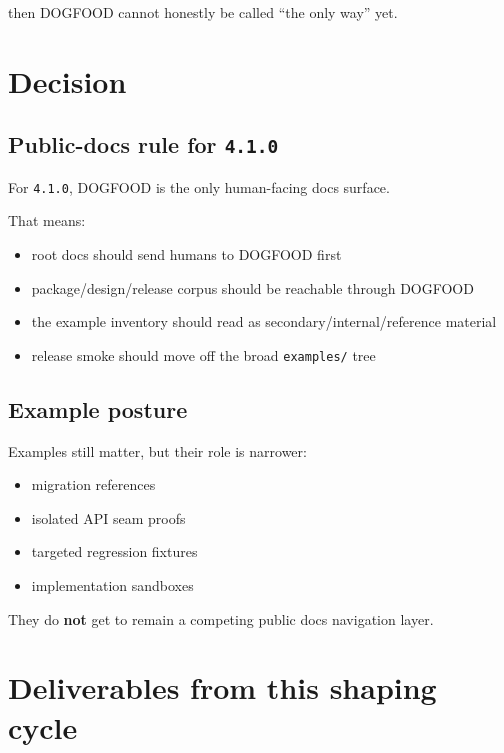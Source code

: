 then DOGFOOD cannot honestly be called ``the only way'' yet.

\section{Decision}\label{record-086-decision}

\subsection{\texorpdfstring{Public-docs rule for \texttt{4\allowbreak{}.\allowbreak{}1\allowbreak{}.\allowbreak{}0}}{Public-docs rule for }}\label{record-086-public-docs-rule-for-4.1.0}

For \texttt{4\allowbreak{}.\allowbreak{}1\allowbreak{}.\allowbreak{}0}, DOGFOOD is the only human-facing docs surface.

That means:

\begin{itemize}
\tightlist
\item
  root docs should send humans to DOGFOOD first
\item
  package/design/release corpus should be reachable through DOGFOOD
\item
  the example inventory should read as secondary/internal/reference material
\item
  release smoke should move off the broad \texttt{e\allowbreak{}x\allowbreak{}a\allowbreak{}m\allowbreak{}p\allowbreak{}l\allowbreak{}e\allowbreak{}s\allowbreak{}/} tree
\end{itemize}

\subsection{Example posture}\label{record-086-example-posture}

Examples still matter, but their role is narrower:

\begin{itemize}
\tightlist
\item
  migration references
\item
  isolated API seam proofs
\item
  targeted regression fixtures
\item
  implementation sandboxes
\end{itemize}

They do \textbf{not} get to remain a competing public docs navigation layer.

\section{Deliverables from this shaping cycle}\label{record-086-deliverables-from-this-shaping-cycle}

